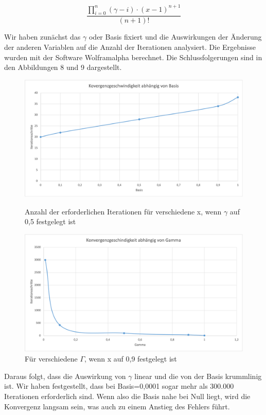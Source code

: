 \documentclass[course=erap]{aspdoc}
\begin{document}
\[
\frac{{\prod_{i=0}^{n} (\gamma - i) \cdot (x-1)^{n+1}}}{{(n+1)!}} \label{eq:gamma_product}
\]

\par
Wir haben zunächst das $\gamma$ oder Basis fixiert und die Auswirkungen der Änderung der anderen Variablen auf die Anzahl der Iterationen analysiert. Die Ergebnisse wurden mit der Software Wolframalpha berechnet. Die Schlussfolgerungen sind in den Abbildungen 8 und 9 dargestellt.

\begin{figure}[h]
\centering
\begin{minipage}{0.48\textwidth}
\centering
\includegraphics[width=0.8\linewidth]{Bilder/KonvergenzBasis.png}
\caption{Anzahl der erforderlichen Iterationen für verschiedene x, wenn $\gamma$ auf 0,5 festgelegt ist}
\label{fig:xchange}
\end{minipage}\hfill
\begin{minipage}{0.48\textwidth}
\centering
\includegraphics[width=0.8\linewidth]{Bilder/KonvergenzGamma.png}
\caption{Für verschiedene $\Gamma$, wenn x auf 0,9 festgelegt ist}
\label{fig:gammachange}
\end{minipage}
\end{figure}

    
\par
Daraus folgt, dass die Auswirkung von $\gamma$ linear und die von der Basis krummlinig ist. Wir haben festgestellt, dass bei Basis=0,0001 sogar mehr als 300.000 Iterationen erforderlich sind. Wenn also die Basis nahe bei Null liegt, wird die Konvergenz langsam sein, was auch zu einem Anstieg des Fehlers führt.
\end{document}
